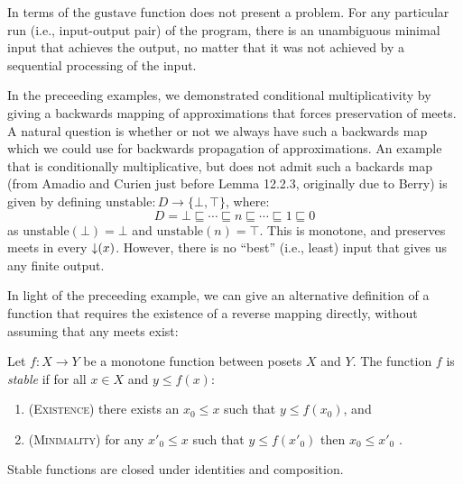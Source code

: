 \begin{example}
  In terms of \GPS the $\mathrm{gustave}$ function does not present a
  problem. For any particular run (i.e., input-output pair) of the
  program, there is an unambiguous minimal input that achieves the
  output, no matter that it was not achieved by a sequential
  processing of the input.
\end{example}

\begin{example}
  \label{ex:non-stable-function}
  In the preceeding examples, we demonstrated conditional
  multiplicativity by giving a backwards mapping of approximations
  that forces preservation of meets. A natural question is whether or
  not we always have such a backwards map which we could use for
  backwards propagation of approximations. An example that is
  conditionally multiplicative, but does not admit such a backards map
  (from Amadio and Curien just before Lemma 12.2.3, originally due to
  Berry) is given by defining
  $\mathrm{unstable} : D \to \{\bot, \top\}$, where:
  \begin{displaymath}
    D = \bot \sqsubseteq \cdots \sqsubseteq n \sqsubseteq \cdots \sqsubseteq 1 \sqsubseteq 0
  \end{displaymath}
  as $\mathrm{unstable}(\bot) = \bot$ and
  $\mathrm{unstable}(n) = \top$. This is monotone, and preserves meets
  in every $\mathop{\downarrow}(x)$. However, there is no ``best'' (i.e., least)
  input that gives us any finite output.
\end{example}

In light of the preceeding example, we can give an alternative
definition of a function that requires the existence of a reverse
mapping directly, without assuming that any meets exist:

\begin{definition}
  Let $f : X \to Y$ be a monotone function between posets $X$ and
  $Y$. The function $f$ is \emph{stable} if for all $x \in X$ and
  $y \leq f(x)$:
  \begin{enumerate}
  \item (\textsc{Existence}) there exists an $x_0 \leq x$ such that $y \leq f(x_0)$, and
  \item (\textsc{Minimality}) for any $x'_0 \leq x$ such that $y \leq f(x'_0)$ then
    $x_0 \leq x'_0$ .
  \end{enumerate}
\end{definition}

\begin{lemma}
  Stable functions are closed under identities and composition.
\end{lemma}


